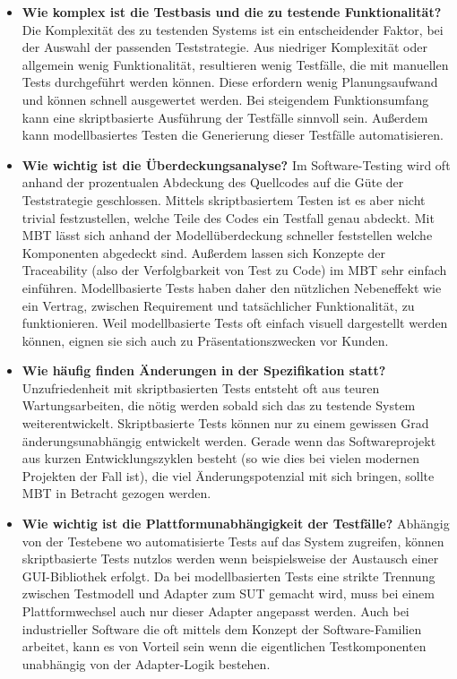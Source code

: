 \begin{itemize}
\item \textbf{Wie komplex ist die Testbasis und die zu testende Funktionalität?}
Die Komplexität des zu testenden Systems ist ein entscheidender Faktor, bei der Auswahl der passenden Teststrategie. Aus niedriger Komplexität oder allgemein wenig Funktionalität, resultieren wenig Testfälle, die mit manuellen Tests durchgeführt werden können. Diese erfordern wenig Planungsaufwand und können schnell ausgewertet werden. Bei steigendem Funktionsumfang kann eine skriptbasierte Ausführung der Testfälle sinnvoll sein. Außerdem kann modellbasiertes Testen die Generierung dieser Testfälle automatisieren.
\item \textbf{Wie wichtig ist die Überdeckungsanalyse?}
Im Software-Testing wird oft anhand der prozentualen Abdeckung des Quellcodes auf die Güte der Teststrategie geschlossen. Mittels skriptbasiertem Testen ist es aber nicht trivial festzustellen, welche Teile des Codes ein Testfall genau abdeckt. Mit \Gls{MBT} lässt sich anhand der Modellüberdeckung schneller feststellen welche Komponenten abgedeckt sind. Außerdem lassen sich Konzepte der Traceability (also der Verfolgbarkeit von Test zu Code) im \Gls{MBT} sehr einfach einführen. Modellbasierte Tests haben daher den nützlichen Nebeneffekt wie ein Vertrag, zwischen Requirement und tatsächlicher Funktionalität, zu funktionieren. Weil modellbasierte Tests oft einfach visuell dargestellt werden können, eignen sie sich auch zu Präsentationszwecken vor Kunden.
\item \textbf{Wie häufig finden Änderungen in der Spezifikation statt?} 
Unzufriedenheit mit skriptbasierten Tests entsteht oft aus teuren Wartungsarbeiten, die nötig werden sobald sich das zu testende System weiterentwickelt. Skriptbasierte Tests können nur zu einem gewissen Grad änderungsunabhängig entwickelt werden. Gerade wenn das Softwareprojekt aus kurzen Entwicklungszyklen besteht (so wie dies bei vielen modernen Projekten der Fall ist), die viel Änderungspotenzial mit sich bringen, sollte \Gls{MBT} in Betracht gezogen werden.
\item \textbf{Wie wichtig ist die Plattformunabhängigkeit der Testfälle?}
Abhängig von der Testebene wo automatisierte Tests auf das System zugreifen, können skriptbasierte Tests nutzlos werden wenn beispielsweise der Austausch einer GUI-Bibliothek erfolgt. Da bei modellbasierten Tests eine strikte Trennung zwischen Testmodell und Adapter zum \Gls{SUT} gemacht wird, muss bei einem Plattformwechsel auch nur dieser Adapter angepasst werden. Auch bei industrieller Software die oft mittels dem Konzept der Software-Familien arbeitet, kann es von Vorteil sein wenn die eigentlichen Testkomponenten unabhängig von der Adapter-Logik bestehen.

\end{itemize}
